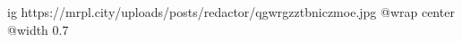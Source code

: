  
 
 
 
 

\ifcmt
  ig https://mrpl.city/uploads/posts/redactor/qgwrgzztbniczmoe.jpg
  @wrap center
  @width 0.7
\fi
